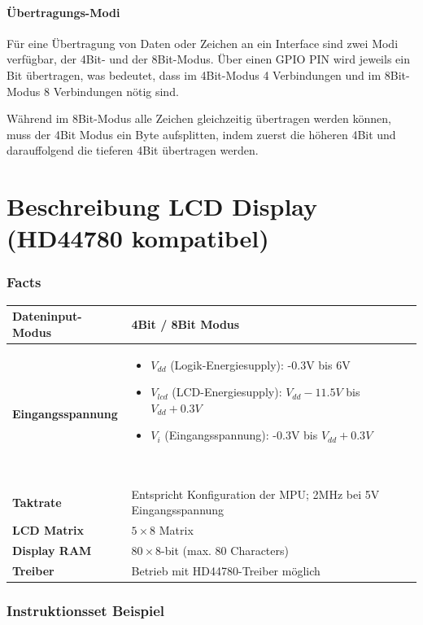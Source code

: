 \documentclass[a4paper,11pt]{article}
\begin{document}
\subsection*{Übertragungs-Modi}
Für eine Übertragung von Daten oder Zeichen an ein Interface sind zwei Modi verfügbar, der 4Bit- und der 8Bit-Modus. Über einen GPIO PIN wird jeweils ein Bit übertragen, was bedeutet, dass im 4Bit-Modus 4 Verbindungen und im 8Bit-Modus 8 Verbindungen nötig sind.\par
Während im 8Bit-Modus alle Zeichen gleichzeitig übertragen werden können, muss der 4Bit Modus ein Byte aufsplitten, indem zuerst die höheren 4Bit und darauffolgend die tieferen 4Bit übertragen werden.

\part{Beschreibung LCD Display (HD44780 kompatibel)}
\section*{Facts}
\begin{tabular}{| p{3.5cm} | p{10cm} |}
	\hline
	\textbf{Dateninput-Modus} & 4Bit / 8Bit Modus\\\hline
	\textbf{Eingangsspannung} & 
	\begin{itemize}
		\item $V_{dd}$ (Logik-Energiesupply): -0.3V bis 6V
		\item $V_{lcd}$ (LCD-Energiesupply): $V_{dd}-11.5V$ bis $V_{dd}+0.3V$
		\item $V_{i}$ (Eingangsspannung): -0.3V bis $V_{dd} + 0.3V$
	\end{itemize}~
	\\\hline
	\textbf{Taktrate} & Entspricht Konfiguration der MPU; 2MHz bei 5V Eingangsspannung\\\hline
	\textbf{LCD Matrix} & $5 \times 8$ Matrix\\\hline
	\textbf{Display RAM} & $80 \times 8$-bit (max. 80 Characters)\\\hline
	\textbf{Treiber} & Betrieb mit HD44780-Treiber möglich\\\hline
\end{tabular}

\section*{Instruktionsset Beispiel}
\end{document}
